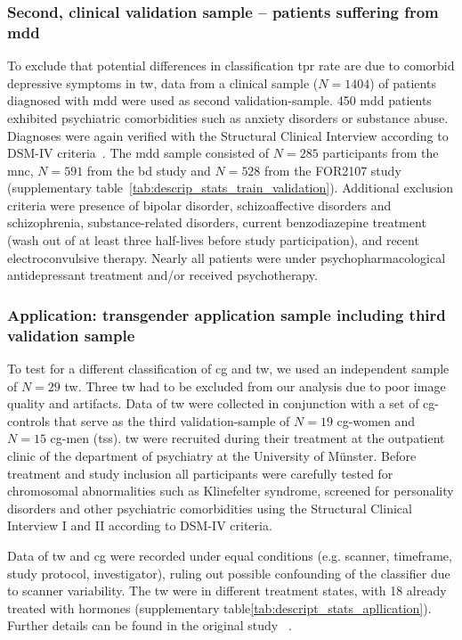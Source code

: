 \documentclass{article}
\begin{document}
    \subsubsection{Second, clinical validation sample – patients suffering from \acf{mdd}}
    To exclude that potential differences in classification \ac{tpr} rate are due to comorbid depressive symptoms in \ac{tw}, data from a clinical sample ($N=1404$) of patients diagnosed with \ac{mdd} were used as second validation-sample. 450 \ac{mdd} patients exhibited psychiatric comorbidities such as anxiety disorders or substance abuse. Diagnoses were again verified with the Structural Clinical Interview according to DSM-IV criteria~\cite{Wittchen1997}. The \ac{mdd} sample consisted of $N=285$ participants from the \ac{mnc}, $N=591$ from the \ac{bd} study and $N=528$ from the FOR2107 study (supplementary table~\ref{tab:descrip_stats_train_validation}). Additional exclusion criteria were presence of bipolar disorder, schizoaffective disorders and schizophrenia, substance-related disorders, current benzodiazepine treatment (wash out of at least three half-lives before study participation), and recent electroconvulsive therapy. Nearly all patients were under psychopharmacological antidepressant treatment and/or received psychotherapy.

    \subsubsection{Application: transgender application sample including third validation sample}
    To test for a different classification of \ac{cg} and \ac{tw}, we used an independent sample of $N=29$ \ac{tw}. Three \ac{tw} had to be excluded from our analysis due to poor image quality and artifacts. Data of \ac{tw} were collected in conjunction with a set of \ac{cg}-controls that serve as the third validation-sample of $N=19$ \ac{cg}-women and $N=15$ \ac{cg}-men (\ac{tss}). \ac{tw} were recruited during their treatment at the outpatient clinic of the department of psychiatry at the University of Münster. Before treatment and study inclusion all participants were carefully tested for chromosomal abnormalities such as Klinefelter syndrome, screened for personality disorders and other psychiatric comorbidities using the Structural Clinical Interview I and II according to DSM-IV criteria.

    Data of \ac{tw} and \ac{cg} were recorded under equal conditions (e.g. scanner, timeframe, study protocol, investigator), ruling out possible confounding of the classifier due to scanner variability. The \ac{tw} were in different treatment states, with 18 already treated with hormones (supplementary table\ref{tab:descript_stats_apllication}). Further details can be found in the original study ~\cite{Schoning2010}.
\end{document}
